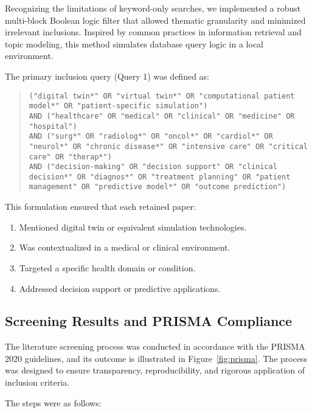 \documentclass[10pt,a4paper]{article}
\begin{document}
Recognizing the limitations of keyword-only searches, we implemented a robust multi-block Boolean logic filter that allowed thematic granularity and minimized irrelevant inclusions. Inspired by common practices in information retrieval and topic modeling, this method simulates database query logic in a local environment.

The primary inclusion query (Query 1) was defined as:

\begin{quote}
\texttt{("digital twin*" OR "virtual twin*" OR "computational patient model*" OR "patient-specific simulation")} \\
\texttt{AND ("healthcare" OR "medical" OR "clinical" OR "medicine" OR "hospital")} \\
\texttt{AND ("surg*" OR "radiolog*" OR "oncol*" OR "cardiol*" OR "neurol*" OR "chronic disease*" OR "intensive care" OR "critical care" OR "therap*")} \\
\texttt{AND ("decision-making" OR "decision support" OR "clinical decision*" OR "diagnos*" OR "treatment planning" OR "patient management" OR "predictive model*" OR "outcome prediction")}
\end{quote}

This formulation ensured that each retained paper:
\begin{enumerate}
    \item Mentioned digital twin or equivalent simulation technologies.
    \item Was contextualized in a medical or clinical environment.
    \item Targeted a specific health domain or condition.
    \item Addressed decision support or predictive applications.
\end{enumerate}




\subsection*{Screening Results and PRISMA Compliance}

The literature screening process was conducted in accordance with the PRISMA 2020 guidelines, and its outcome is illustrated in Figure~\ref{fig:prisma}. The process was designed to ensure transparency, reproducibility, and rigorous application of inclusion criteria.

\vspace{1em}
\noindent The steps were as follows:
\end{document}

